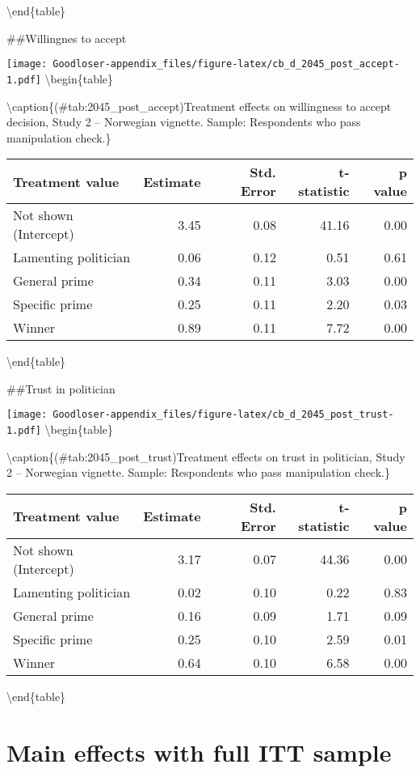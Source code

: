 \documentclass[
]{book}
\begin{document}
\textbackslash end\{table\}

\#\#Willingnes to accept

\texttt{[image: Goodloser-appendix\_files/figure-latex/cb\_d\_2045\_post\_accept-1.pdf]} \textbackslash begin\{table\}

\textbackslash caption\{(\#tab:2045\_post\_accept)Treatment effects on willingness to accept decision, Study 2 -- Norwegian vignette. Sample: Respondents who pass manipulation check.\}
\centering

\begin{tabular}[t]{lrrrr}
\toprule
Treatment value & Estimate & Std. Error & t-statistic & p value\\
\midrule
Not shown (Intercept) & 3.45 & 0.08 & 41.16 & 0.00\\
Lamenting politician & 0.06 & 0.12 & 0.51 & 0.61\\
General prime & 0.34 & 0.11 & 3.03 & 0.00\\
Specific prime & 0.25 & 0.11 & 2.20 & 0.03\\
Winner & 0.89 & 0.11 & 7.72 & 0.00\\
\bottomrule
\end{tabular}

\textbackslash end\{table\}

\#\#Trust in politician

\texttt{[image: Goodloser-appendix\_files/figure-latex/cb\_d\_2045\_post\_trust-1.pdf]} \textbackslash begin\{table\}

\textbackslash caption\{(\#tab:2045\_post\_trust)Treatment effects on trust in politician, Study 2 -- Norwegian vignette. Sample: Respondents who pass manipulation check.\}
\centering

\begin{tabular}[t]{lrrrr}
\toprule
Treatment value & Estimate & Std. Error & t-statistic & p value\\
\midrule
Not shown (Intercept) & 3.17 & 0.07 & 44.36 & 0.00\\
Lamenting politician & 0.02 & 0.10 & 0.22 & 0.83\\
General prime & 0.16 & 0.09 & 1.71 & 0.09\\
Specific prime & 0.25 & 0.10 & 2.59 & 0.01\\
Winner & 0.64 & 0.10 & 6.58 & 0.00\\
\bottomrule
\end{tabular}

\textbackslash end\{table\}

\hypertarget{main-effects-with-full-itt-sample}{%
\chapter{Main effects with full ITT sample}\label{main-effects-with-full-itt-sample}}
\end{document}
